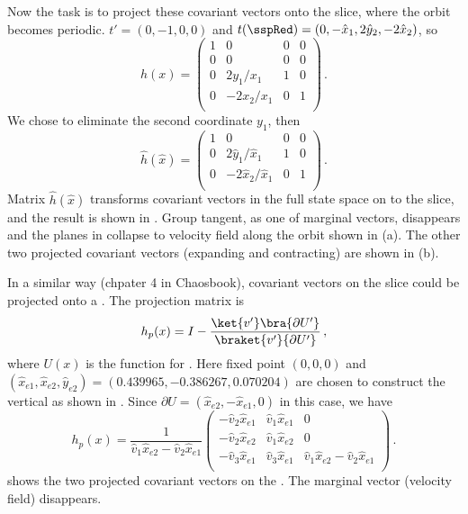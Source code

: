 Now the task is to project these covariant vectors onto the slice, where
the orbit becomes periodic. $t'=(0,-1,0,0)$ and
$t(\sspRed)=(0,-\hat{x}_{1},2\hat{y}_{2},-2\hat{x}_{2})$, so
\[h(x)=
\begin{pmatrix}
  1 & 0 & 0 & 0 \\
  0 & 0 & 0 & 0 \\
  0 & 2y_{1}/x_{1} & 1 & 0 \\
  0 & -2x_{2}/x_{1} & 0 & 1 \\
\end{pmatrix}
\,.
\]
We chose to eliminate the second coordinate $y_{1}$, then
\[ \hat{h}(\hat{x})=
\begin{pmatrix}
  1 & 0 & 0 & 0 \\
  0 & 2\hat{y}_{1}/\hat{x}_{1} & 1 & 0 \\
  0 & -2\hat{x}_{2}/\hat{x}_{1} & 0 & 1 \\
\end{pmatrix}
\,.
\]
Matrix $\hat{h}(\hat{x})$ transforms covariant vectors in the full state
space on to the slice, and the result is shown in
. Group tangent, as one of marginal vectors,
disappears and the planes in  collapse to velocity
field along the orbit shown in (a). The other two projected covariant
vectors (expanding and contracting) are shown in (b).

In a similar way (chpater 4 in Chaosbook), covariant vectors on
the slice could be
projected onto a {\PoincSec}. The projection matrix is
\[
 h_{p}(x)=I-\frac{\ket{v'}\bra{\partial U'}}{\braket{v'}{\partial U'}}
 \,,
\]
where $U(x)$ is the function for {\PoincSec}. Here fixed point $(0,0,0)$
and \reqv\ $(\hat{x}_{e1}, \hat{x}_{e2},
\hat{y}_{e2})=(0.439965, -0.386267, 0.070204)$ are chosen to construct
the vertical {\PoincSec} as shown in .
Since $\partial U=(\hat{x}_{e2},- \hat{x}_{e1}, 0)$ in this case, we have
\[
h_{p}(x)=\frac{1}{\hat{v}_{1}\hat{x}_{e2}-\hat{v}_{2}\hat{x}_{e1}}
\begin{pmatrix}
  -\hat{v}_{2}\hat{x}_{e1} & \hat{v}_{1}\hat{x}_{e1} & 0 \\
  -\hat{v}_{2}\hat{x}_{e2} & \hat{v}_{1}\hat{x}_{e2} & 0 \\
  -\hat{v}_{3}\hat{x}_{e1} & \hat{v}_{3}\hat{x}_{e1} &
  \hat{v}_{1}\hat{x}_{e2}-\hat{v}_{2}\hat{x}_{e1}\\
\end{pmatrix}
\,.
\]
 shows the two projected covariant
vectors on the {\PoincSec}. The marginal vector (velocity field)
disappears.

